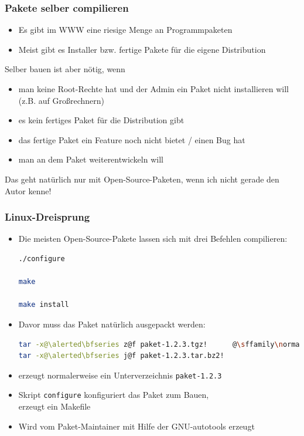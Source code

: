 \documentclass{slides}
\begin{document}
\begin{frame}
  \frametitle{Pakete selber compilieren}

  \begin{itemize}
  \item Es gibt im WWW eine riesige Menge an Programmpaketen
  \item Meist gibt es Installer bzw. fertige Pakete für die eigene Distribution
  \end{itemize}

  Selber bauen ist aber nötig, wenn
  \begin{itemize}
  \item man keine Root-Rechte hat und der Admin ein Paket nicht installieren will
    (z.B. auf Großrechnern)
  \item es kein fertiges Paket für die Distribution gibt
  \item das fertige Paket ein Feature noch nicht bietet / einen Bug hat
  \item man an dem Paket weiterentwickeln will
  \end{itemize}

  Das geht natürlich nur mit Open-Source-Paketen, wenn ich nicht gerade den Autor kenne!
\end{frame}

\begin{frame}[fragile]
  \frametitle{Linux-Dreisprung}
  
  \begin{itemize}
  \item Die meisten Open-Source-Pakete lassen sich mit drei Befehlen compilieren:
\begin{lstlisting}[language=bash]
./configure

make

make install
\end{lstlisting}
  \item Davor muss das Paket natürlich ausgepackt werden:\\
\begin{lstlisting}[language=bash,style=unframed]
tar -x@\alerted\bfseries z@f paket-1.2.3.tgz!      @\sffamily\normalsize oder@
tar -x@\alerted\bfseries j@f paket-1.2.3.tar.bz2!
\end{lstlisting}
  \item erzeugt normalerweise ein Unterverzeichnis \lstinline!paket-1.2.3!
  \item Skript \lstinline!configure! konfiguriert das Paket zum Bauen,\\
    erzeugt ein Makefile
  \item Wird vom Paket-Maintainer mit Hilfe der GNU-autotools erzeugt
  \end{itemize}
\end{frame}
\end{document}
